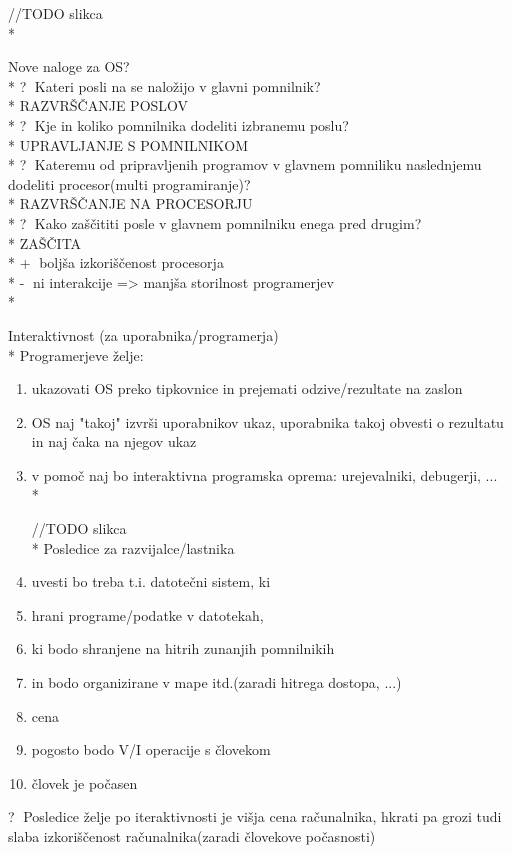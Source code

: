 \documentclass[
  slovene,
  a4paper
]{book}
\begin{document}
//TODO slikca\\*

Nove naloge za OS?\\*
\textcircled{?} Kateri posli na se naložijo v glavni pomnilnik?\\*
RAZVRŠČANJE POSLOV\\*
\textcircled{?} Kje in koliko pomnilnika dodeliti izbranemu poslu?\\*
UPRAVLJANJE S POMNILNIKOM\\*
\textcircled{?} Kateremu od pripravljenih programov v glavnem pomniliku naslednjemu dodeliti procesor(multi programiranje)?\\*
RAZVRŠČANJE NA PROCESORJU\\*
\textcircled{?} Kako zaščititi posle v glavnem pomnilniku enega pred drugim?\\*
ZAŠČITA\\*
\textcircled{+} boljša izkoriščenost procesorja\\*
\textcircled{-} ni interakcije => manjša storilnost programerjev\\*

Interaktivnost (za uporabnika/programerja)\\*
Programerjeve želje:
\begin{enumerate}
  \item ukazovati OS preko tipkovnice in prejemati odzive/rezultate na zaslon
  \item OS naj "takoj" izvrši uporabnikov ukaz, uporabnika takoj obvesti o rezultatu in naj čaka na njegov ukaz
  \item v pomoč naj bo interaktivna programska oprema: urejevalniki, debugerji, ...\\*

//TODO slikca\\*
Posledice za razvijalce/lastnika
  \item uvesti bo treba t.i. datotečni sistem, ki
  	\item hrani programe/podatke v datotekah,
  	\item ki bodo shranjene na hitrih zunanjih pomnilnikih
	\item in bodo organizirane v mape itd.(zaradi hitrega dostopa, ...)
  \item cena
  \item pogosto bodo V/I operacije s človekom
  \item človek je počasen
\end{enumerate}

\textcircled{?} Posledice želje po iteraktivnosti je višja cena računalnika, hkrati pa grozi tudi slaba izkoriščenost računalnika(zaradi človekove počasnosti)
\end{document}
